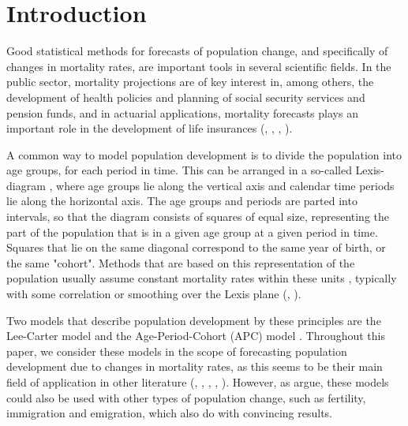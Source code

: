 \section{Introduction}

Good statistical methods for forecasts of population change, and specifically of changes in mortality rates, are important tools in several scientific fields. In the public sector, mortality projections are of key interest in, among others, the development of health policies and planning of social security services and pension funds, and in actuarial applications, mortality forecasts plays an important role in the development of life insurances (\textcite{BROUHNS2002373}, \textcite{RENSHAW2006556}, \textcite{CZADO2005260}, \textcite{LeeCarter1992}). 

\newpar A common way to model population development is to divide the population into age groups, for each period in time. This can be arranged in a so-called Lexis-diagram \parencite{CZADO2005260}, where age groups lie along the vertical axis and calendar time periods lie along the horizontal axis. The age groups and periods are parted into intervals, so that the diagram consists of squares of equal size, representing the part of the population that is in a given age group at a given period in time. Squares that lie on the same diagonal correspond to the same year of birth, or the same "cohort". Methods that are based on this representation of the population usually assume constant mortality rates within these units \parencite{CZADO2005260}, typically with some correlation or smoothing over the Lexis plane (\textcite{CZADO2005260}, \textcite{RieblerThesis2010}). 

\newpar Two models that describe population development by these principles are the Lee-Carter model \parencite{LeeCarter1992} and the Age-Period-Cohort (APC) model \parencite{Clayton1987}. Throughout this paper, we consider these models in the scope of forecasting population development due to changes in mortality rates, as this seems to be their main field of application in other literature (\textcite{LeeCarter1992}, \textcite{RieblerThesis2010}, \textcite{CZADO2005260}, \textcite{BROUHNS2002373}, \textcite{RENSHAW2006556}). However, as \textcite{Wisniowski2015} argue, these models could also be used with other types of population change, such as fertility, immigration and emigration, which \textcite{Wisniowski2015} also do with convincing results. 

